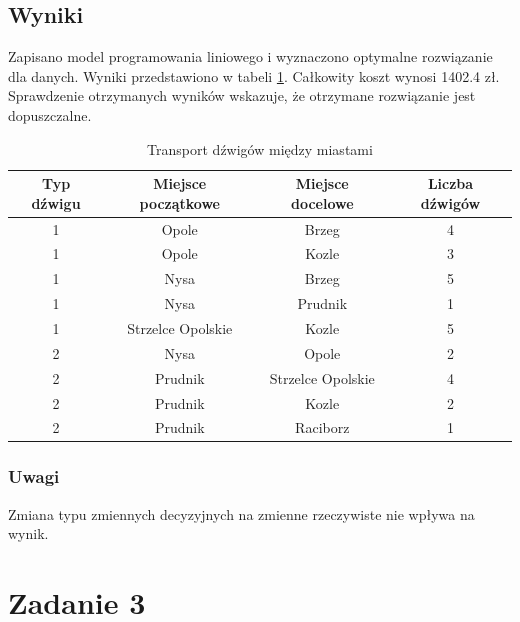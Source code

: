\documentclass{article}
\begin{document}
\subsection{Wyniki}
Zapisano model programowania liniowego i wyznaczono optymalne rozwiązanie dla danych. Wyniki przedstawiono w tabeli \ref{tab:transport_dzwigow}.
Całkowity koszt wynosi 1402.4 zł. Sprawdzenie otrzymanych wyników wskazuje, że otrzymane rozwiązanie jest dopuszczalne.

\begin{table}[h]
    \centering
    \begin{tabular}{c|ccc}
        Typ dźwigu & Miejsce początkowe & Miejsce docelowe & Liczba dźwigów \\
        \hline
        1 & Opole & Brzeg & 4 \\
        1 & Opole & Kozle & 3 \\
        1 & Nysa & Brzeg & 5 \\
        1 & Nysa & Prudnik & 1 \\
        1 & Strzelce Opolskie & Kozle & 5 \\
        2 & Nysa & Opole & 2 \\
        2 & Prudnik & Strzelce Opolskie & 4 \\
        2 & Prudnik & Kozle & 2 \\
        2 & Prudnik & Raciborz & 1 \\
    \end{tabular}
    \caption{Transport dźwigów między miastami}
    \label{tab:transport_dzwigow}
\end{table}

\subsubsection{Uwagi}
Zmiana typu zmiennych decyzyjnych na zmienne rzeczywiste nie wpływa na wynik.

\section{Zadanie 3}
\end{document}
